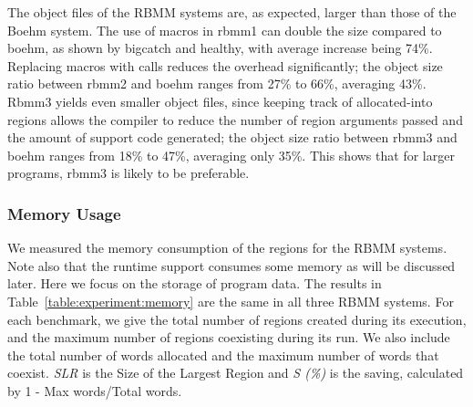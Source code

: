 \documentclass{tlp}
\newcommand{\bench}[1]{{#1}}
\begin{document}
The object files of the RBMM systems are, as expected,
larger than those of the Boehm system.
The use of macros in rbmm1 can double the size compared to boehm,
as shown by \bench{bigcatch} and \bench{healthy},
with average increase being 74\%.
Replacing macros with calls reduces the overhead significantly;
the object size ratio between rbmm2 and boehm
ranges from 27\% to 66\%, averaging 43\%.
Rbmm3 yields even smaller object files,
since keeping track of allocated-into regions
allows the compiler to reduce
the number of region arguments passed
and the amount of support code generated;
the object size ratio between rbmm3 and boehm
ranges from 18\% to 47\%, averaging only 35\%.
This shows that for larger programs, rbmm3 is likely to be preferable.

\subsubsection{Memory Usage}

We measured the memory consumption of the regions for the RBMM systems.
Note also that the runtime support consumes some memory
as will be discussed later.
Here we focus on the storage of program data.
The results in Table~\ref{table:experiment:memory}
are the same in all three RBMM systems.
For each benchmark,
we give the total number of regions created during its execution,
and the maximum number of regions coexisting during its run.
We also include the total number of words allocated
and the maximum number of words that coexist.
\emph{SLR} is the Size of the Largest Region and
\emph{S (\%)} is the saving, calculated by 1 - Max words/Total words.
\end{document}
